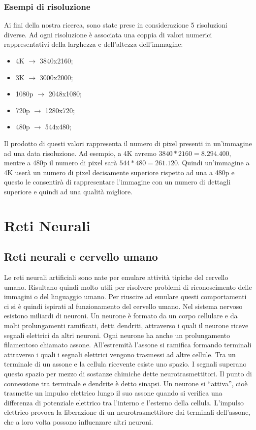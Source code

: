 \documentclass[a4paper,11pt]{article}
\begin{document}
    \subsubsection{Esempi di risoluzione}
    Ai fini della nostra ricerca, sono state prese in considerazione 5 risoluzioni diverse. Ad ogni risoluzione
    è associata una coppia di valori numerici rappresentativi della larghezza e dell'altezza dell'immagine:
    \begin{itemize}
        \item 4K $\rightarrow$ 3840x2160;
        \item 3K $\rightarrow$ 3000x2000;
        \item 1080p $\rightarrow$ 2048x1080;
        \item 720p $\rightarrow$ 1280x720;
        \item 480p $\rightarrow$ 544x480;
    \end{itemize}
    Il prodotto di questi valori rappresenta il numero di pixel presenti in un'immagine ad una data risoluzione.
    Ad esempio, a 4K avremo $3840*2160 = 8.294.400$, mentre a 480p il numero di pixel sarà $544*480 = 261.120$.
    Quindi un'immagine a 4K userà un numero di pixel decisamente superiore rispetto ad una a 480p e questo le consentirà
    di rappresentare l'immagine con un numero di dettagli superiore e quindi ad una qualità migliore.
    \newpage
    \section {Reti Neurali}
    \subsection {Reti neurali e cervello umano}
    Le reti neurali artificiali sono nate per emulare attività tipiche del
    cervello umano. Risultano quindi molto utili per risolvere problemi di riconoscimento delle immagini o del linguaggio umano.
    Per riuscire ad emulare questi comportamenti ci si è quindi ispirati al funzionamento del cervello umano.
    Nel sistema nervoso esistono miliardi di neuroni. Un
    neurone è formato da un corpo cellulare e da molti prolungamenti
    ramificati, detti dendriti, attraverso i quali il neurone riceve segnali
    elettrici da altri neuroni. Ogni neurone ha anche un prolungamento
    filamentoso chiamato assone. All’estremità l’assone si ramifica formando terminali
    attraverso i quali i segnali elettrici vengono trasmessi ad altre cellule.
    Tra un terminale di un assone e la cellula ricevente esiste uno spazio. I segnali superano questo spazio per
    mezzo di sostanze chimiche dette neurotrasmettitori. Il punto di
    connessione tra terminale e dendrite è detto sinapsi. 
    Un neurone si “attiva”, cioè trasmette un impulso elettrico lungo il suo
    assone quando si verifica una differenza di potenziale elettrico tra l’interno
    e l’esterno della cellula. L’impulso elettrico provoca la liberazione di un
    neurotrasmettitore dai terminali dell’assone, che a loro volta possono influenzare altri neuroni. 
        
\end{document}
